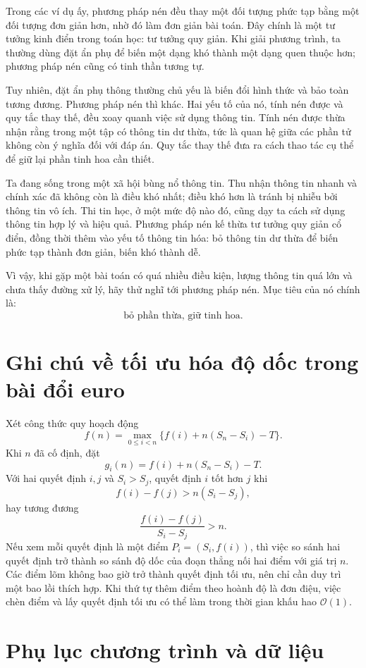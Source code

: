 \documentclass[11pt]{article}
\newcommand{\Oh}{\mathcal{O}}
\begin{document}
Trong các ví dụ ấy, phương pháp nén đều thay một đối tượng phức tạp bằng một
đối tượng đơn giản hơn, nhờ đó làm đơn giản bài toán. Đây chính là một tư
tưởng kinh điển trong toán học: tư tưởng quy giản. Khi giải phương trình, ta
thường dùng đặt ẩn phụ để biến một dạng khó thành một dạng quen thuộc hơn;
phương pháp nén cũng có tinh thần tương tự.

Tuy nhiên, đặt ẩn phụ thông thường chủ yếu là biến đổi hình thức và bảo toàn
tương đương. Phương pháp nén thì khác. Hai yếu tố của nó, tính nén được và
quy tắc thay thế, đều xoay quanh việc sử dụng thông tin. Tính nén được thừa
nhận rằng trong một tập có thông tin dư thừa, tức là quan hệ giữa các phần tử
không còn ý nghĩa đối với đáp án. Quy tắc thay thế đưa ra cách thao tác cụ
thể để giữ lại phần tinh hoa cần thiết.

Ta đang sống trong một xã hội bùng nổ thông tin. Thu nhận thông tin nhanh và
chính xác đã không còn là điều khó nhất; điều khó hơn là tránh bị nhiễu bởi
thông tin vô ích. Thi tin học, ở một mức độ nào đó, cũng dạy ta cách sử dụng
thông tin hợp lý và hiệu quả. Phương pháp nén kế thừa tư tưởng quy giản cổ
điển, đồng thời thêm vào yếu tố thông tin hóa: bỏ thông tin dư thừa để biến
phức tạp thành đơn giản, biến khó thành dễ.

Vì vậy, khi gặp một bài toán có quá nhiều điều kiện, lượng thông tin quá lớn
và chưa thấy đường xử lý, hãy thử nghĩ tới phương pháp nén. Mục tiêu của nó
chính là:
\[
  \text{bỏ phần thừa, giữ tinh hoa.}
\]

\appendix
\section{Ghi chú về tối ưu hóa độ dốc trong bài đổi euro}

Xét công thức quy hoạch động
\[
  f(n)=\max_{0\le i<n}\{f(i)+n(S_n-S_i)-T\}.
\]
Khi $n$ đã cố định, đặt
\[
  g_i(n)=f(i)+n(S_n-S_i)-T.
\]
Với hai quyết định $i,j$ và $S_i>S_j$, quyết định $i$ tốt hơn $j$ khi
\[
  f(i)-f(j)>n(S_i-S_j),
\]
hay tương đương
\[
  \frac{f(i)-f(j)}{S_i-S_j}>n.
\]
Nếu xem mỗi quyết định là một điểm $P_i=(S_i,f(i))$, thì việc so sánh hai
quyết định trở thành so sánh độ dốc của đoạn thẳng nối hai điểm với giá trị
$n$. Các điểm lõm không bao giờ trở thành quyết định tối ưu, nên chỉ cần duy
trì một bao lồi thích hợp. Khi thứ tự thêm điểm theo hoành độ là đơn điệu,
việc chèn điểm và lấy quyết định tối ưu có thể làm trong thời gian khấu hao
$\Oh(1)$.

\section{Phụ lục chương trình và dữ liệu}
\end{document}
